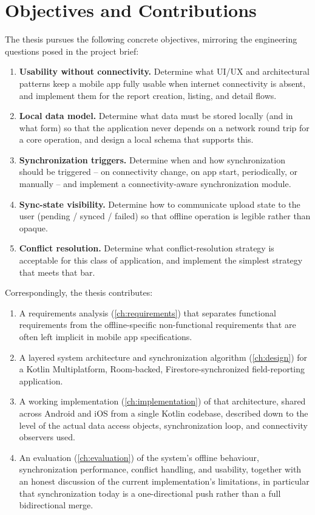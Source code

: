 \section{Objectives and Contributions}
\label{sec:objectives}

The thesis pursues the following concrete objectives, mirroring the
engineering questions posed in the project brief:

\begin{enumerate}[label=\textbf{O\arabic*.}]
  \item \textbf{Usability without connectivity.} Determine what UI/UX and
  architectural patterns keep a mobile app fully usable when internet
  connectivity is absent, and implement them for the report creation,
  listing, and detail flows.
  \item \textbf{Local data model.} Determine what data must be stored
  locally (and in what form) so that the application never depends on a
  network round trip for a core operation, and design a local schema that
  supports this.
  \item \textbf{Synchronization triggers.} Determine when and how
  synchronization should be triggered -- on connectivity change, on app
  start, periodically, or manually -- and implement a connectivity-aware
  synchronization module.
  \item \textbf{Sync-state visibility.} Determine how to communicate
  upload state to the user (pending / synced / failed) so that offline
  operation is legible rather than opaque.
  \item \textbf{Conflict resolution.} Determine what conflict-resolution
  strategy is acceptable for this class of application, and implement the
  simplest strategy that meets that bar.
\end{enumerate}

Correspondingly, the thesis contributes:

\begin{enumerate}[label=\textbf{C\arabic*.}]
  \item A requirements analysis (\cref{ch:requirements}) that separates
  functional requirements from the offline-specific non-functional
  requirements that are often left implicit in mobile app specifications.
  \item A layered system architecture and synchronization algorithm
  (\cref{ch:design}) for a Kotlin Multiplatform, Room-backed,
  Firestore-synchronized field-reporting application.
  \item A working implementation (\cref{ch:implementation}) of that
  architecture, shared across Android and iOS from a single Kotlin
  codebase, described down to the level of the actual data access objects,
  synchronization loop, and connectivity observers used.
  \item An evaluation (\cref{ch:evaluation}) of the system's offline
  behaviour, synchronization performance, conflict handling, and usability,
  together with an honest discussion of the current implementation's
  limitations, in particular that synchronization today is a one-directional
  push rather than a full bidirectional merge.
\end{enumerate}

